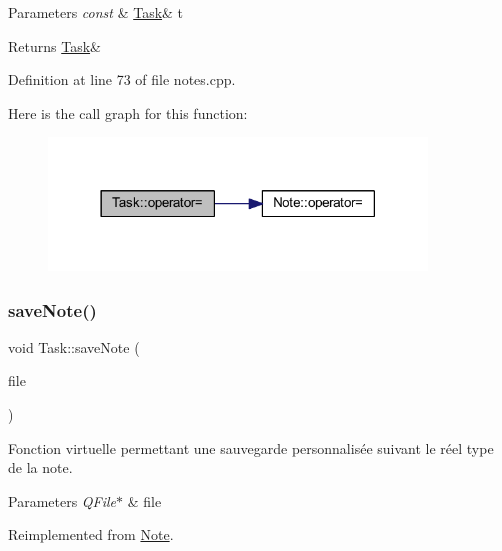 \begin{DoxyParams}{Parameters}
{\em const} & \hyperlink{class_task}{Task}\& t \\
\hline
\end{DoxyParams}
\begin{DoxyReturn}{Returns}
\hyperlink{class_task}{Task}\& 
\end{DoxyReturn}


Definition at line 73 of file notes.\+cpp.

Here is the call graph for this function\+:\nopagebreak
\begin{figure}[H]
\begin{center}
\leavevmode
\includegraphics[width=285pt]{class_task_a2430b942d050bf32c771821daa31493f_cgraph}
\end{center}
\end{figure}
\mbox{\label{class_task_a313eb342d047e8e5cab91bf51609a2f3}} 
\subsubsection{\texorpdfstring{save\+Note()}{saveNote()}}
{\footnotesize\ttfamily void Task\+::save\+Note (\begin{DoxyParamCaption}\item[{Q\+File $\ast$}]{file }\end{DoxyParamCaption})\hspace{0.3cm}{\ttfamily [virtual]}}



Fonction virtuelle permettant une sauvegarde personnalisée suivant le réel type de la note. 


\begin{DoxyParams}{Parameters}
{\em Q\+File$\ast$} & file \\
\hline
\end{DoxyParams}


Reimplemented from \hyperlink{class_note_a0c2cc72d7f3235c665a30ef915c5c58d}{Note}.



